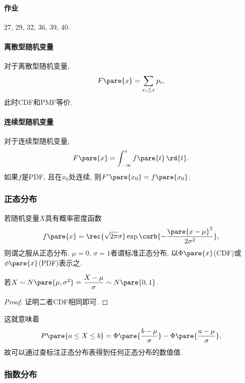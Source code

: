 \documentclass{ctexart}
\begin{document}
\paragraph{作业} %
\label{par:作业}

27, 29, 32, 36, 39, 40.


\paragraph{离散型随机变量} %
\label{par:离散型随机变量}

对于离散型随机变量,
\[ F\pare{x} = \sum_{x_i \le x} p_i, \]
此时CDF和PMF等价.


\paragraph{连续型随机变量} %
\label{par:连续型随机变量}

对于连续型随机变量,
\[ F\pare{x} = \int_{-\infty}^x f\pare{t}\,\rd{t}. \]
如果$f$是PDF, {\color{red}且在$x_0$处连续}, 则$F'\pare{x_0} = f\pare{x_0}$.


\subsubsection{正态分布} %
\label{ssub:正态分布}

若随机变量$X$具有概率密度函数
\[ f\pare{x} = \rec{\sqrt{2\pi}\sigma} \exp\curb{-\frac{\pare{x-\mu}^2}{2\sigma^2}}, \]
则谓之服从正态分布. $\mu = 0$, $\sigma=1$者谓标准正态分布, 以$\Phi\pare{x}$(CDF)或$\phi\pare{x}$(PDF)表示之.
\begin{lemma}
    若$X\sim N\pare{\mu,\sigma^2} = \displaystyle \frac{X - \mu}{\sigma} \sim N\pare{0,1}$.
\end{lemma}
\begin{proof}
    证明二者CDF相同即可.
\end{proof}
这就意味着
\[ P\pare{a\le X \le b} = \Phi\pare{\frac{b-\mu}{\sigma}} - \Phi\pare{\frac{a-\mu}{\sigma}}, \]
故可以通过查标注正态分布表得到任何正态分布的数值值.


\subsubsection{指数分布} %
\label{ssub:指数分布}
\end{document}
